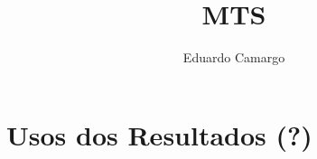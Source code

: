 \documentclass[12pt,graybox,envcountchap,sectrefs]{svmono}
\title{MTS}
\author{Eduardo Camargo}
\newcommand{\geralPasta}{../geral}
\newcommand{\eduPasta}{../edu}
\begin{document}
\maketitle

\tableofcontents


	
	




	
	
	


	\chapter{Usos dos Resultados (?)}
	\label{cap:resultados} %


	



\backmatter

	
	

    
	
	\printindex
\end{document}
